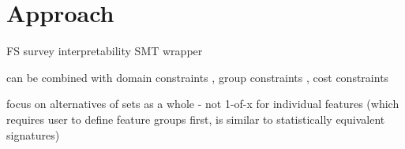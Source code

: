 \section{Approach}
\label{sec:approach}

FS survey \cite{li2017feature, chandrashekar2014survey, guyon2003introduction}
interpretability \cite{carvalho2019machine}
SMT \cite{barrett2018satisfiability}
wrapper \cite{kohavi1997wrappers}

can be combined with domain constraints \cite{groves2015toward}, group constraints \cite{yuan2006model}, cost constraints \cite{paclik2002feature}

focus on alternatives of sets as a whole - not 1-of-x for individual features (which requires user to define feature groups first, is similar to statistically equivalent signatures)
